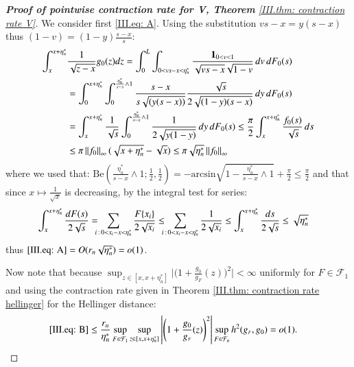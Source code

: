 \begin{proof}[\hypertarget{III.proof contraction pointwise V}{\textbf{Proof of pointwise contraction rate for V, Theorem} \ref{III.thm: contraction rate V}}]
    We consider first \eqref{III.eq: A}. Using the substitution $vs - x = y(s-x)$ thus $(1-v) = (1-y) \frac{s-x}{s}$:
    \begin{align*}
        \int_x^{x+\eta^*_n} &\frac{1}{\sqrt{z-x}} g_{0}(z) dz = \int_0^L \int_{0 < vs- x < \eta^*_n} \frac{\mathbf{1}_{0 < v < 1}}{\sqrt{vs-x} \sqrt{1-v}} \, dv \, dF_0(s)\\ 
        &= \int_0^{x+\eta^*_n} \int_0^{\frac{\eta^*_n}{s-x} \wedge 1}  \frac{s-x}{s\sqrt{(y(s-x))}  } \frac{\sqrt{s}}{2\sqrt{(1-y)(s-x)}}  \, dy \, dF_0(s) \\
        &= \int_x^{x+\eta^*_n} \frac{1}{\sqrt{s}} \int_0^{\frac{\eta^*_n}{s-x} \wedge 1} \frac{1}{2 \sqrt{y(1-y)}} \, dy \,  dF_0(s) \leq \frac{\pi}{2} \int_x^{x+\eta^*_n} \frac{f_0(s)}{\sqrt{s}}  \, ds \\
        & \leq \pi \left\| f_0 \right\|_\infty (\sqrt{x+\eta^*_n} - \sqrt{x}) \leq \pi \sqrt{\eta^*_n} \left\| f_0 \right\|_\infty 
    \end{align*}
    where we used that: $\mathrm{Be}(\frac{\eta^*_n}{s-x} \wedge 1 ; \frac{1}{2}, \frac{1}{2}) = -\mathrm{arcsin} \sqrt{1 - \frac{\eta^*_n}{s-x} \wedge 1} + \frac{\pi}{2} \leq \frac{\pi}{2}$ and that since $x \mapsto \frac{1}{\sqrt{x}}$ is decreasing, by the integral test for series:
    \begin{align*}
        \int_x^{x+\eta^*_n} \frac{dF(s)}{2 \sqrt{s}}  &= \hspace{-0.2 cm} \sum_{i \, : \, 0 < x_i - x < \eta^*_n} \frac{F\{x_i\}}{2 \sqrt{x_i}}  \leq \hspace{-0.2 cm}\sum_{i \, : \, 0 < x_i - x < \eta^*_n} \frac{1}{2 \sqrt{x_i}} \leq \int_x^{x+\eta^*_n} \frac{ds}{2 \sqrt{s}} \leq \sqrt{\eta^*_n}
    \end{align*}
    thus $\eqref{III.eq: A} = O(r_n \sqrt{\eta^*_n}) =o(1)$.

    Now note that because $\sup_{z \in [x, x+\eta^*_n]} \big| \big( 1 + \frac{g_0}{g_{\scriptscriptstyle{F}}} (z) \big)^2  \big| < \infty$ uniformly for $F \in \mathcal{F}_1$ and using the contraction rate given in Theorem \ref{III.thm: contraction rate hellinger} for the Hellinger distance: 
    \begin{align*}
        \eqref{III.eq: B} &\leq \frac{r_n}{\eta^*_n} \sup_{F \in \mathcal{F}_1} \sup_{z \in [x, x+\eta^*_n]} \left| \left( 1 + \frac{g_0}{g_{\scriptscriptstyle{F}}}(z) \right)^2  \right| \sup_{F \in \mathcal{F}_n} h^2(g_{\scriptscriptstyle{F}}, g_0) = o(1).
    \end{align*}
    

\end{proof}
